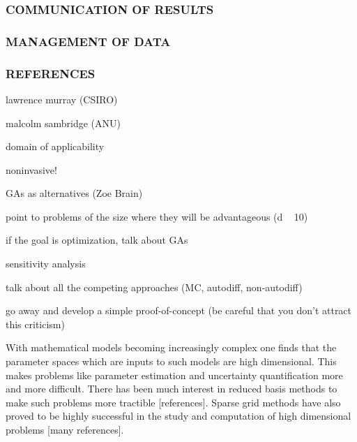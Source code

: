 \documentclass[a4paper,fontsize=12pt]{scrartcl}
\begin{document}
\subsubsection*{COMMUNICATION OF RESULTS}



\subsubsection*{MANAGEMENT OF DATA}



\subsubsection*{REFERENCES}




lawrence murray (CSIRO)

malcolm sambridge (ANU)

domain of applicability

noninvasive!

GAs as alternatives (Zoe Brain)

point to problems of the size where they will be advantageous (d ~ 10)

if the goal is optimization, talk about GAs

sensitivity analysis

talk about all the competing approaches (MC, autodiff, non-autodiff)

go away and develop a simple proof-of-concept (be careful that you
don't attract this criticism)










With mathematical models becoming increasingly complex one finds that
the parameter spaces which are inputs to such models are high
dimensional. This makes problems like parameter estimation and
uncertainty quantification more and more difficult. There has been
much interest in reduced basis methods to make such problems more
tractible [references]. Sparse grid methods have also proved to be
highly successful in the study and computation of high dimensional
problems [many references].
\end{document}
